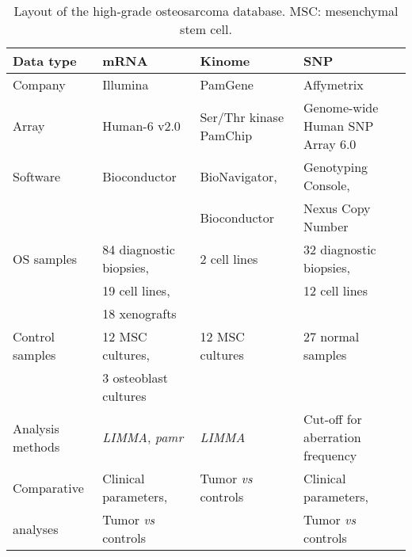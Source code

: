 \begin{table}[htbp]
	\centering
	\small
		\begin{tabular}[c]{|ll >{\raggedright}p{1.2in} >{\raggedright}p{1.55in}|}
		\hline
		Data type & mRNA & Kinome & SNP\tabularnewline
		\hline
		Company & Illumina & PamGene & Affymetrix\tabularnewline
		Array & Human-6 v2.0 & Ser/Thr kinase PamChip & Genome\hyp{}wide Human SNP Array 6.0\tabularnewline
		Software & Bioconductor & BioNavigator, & Genotyping Console,\tabularnewline
		& & Bioconductor & Nexus Copy Number\tabularnewline
		OS samples & 84 diagnostic biopsies, & 2 cell lines & 32 diagnostic biopsies,\tabularnewline
		& 19 cell lines, & & 12 cell lines\tabularnewline
		& 18 xenografts & &\tabularnewline
		Control samples & 12 MSC cultures, & 12 MSC cultures & 27 normal samples\tabularnewline
		& 3 osteoblast cultures  & & \\
		Analysis methods & {\it LIMMA}, {\it pamr} & {\it LIMMA} & Cut-off for aberration frequency\tabularnewline
		Comparative & Clinical parameters, & Tumor {\it vs} controls & Clinical parameters,\tabularnewline
		analyses & Tumor {\it vs} controls  & & Tumor {\it vs} controls\tabularnewline
			\hline
		\end{tabular}
		\caption{Layout of the high-grade osteosarcoma database. MSC: mesenchymal stem cell.}
		\label{tab1.1}
	\end{table}
%

%
